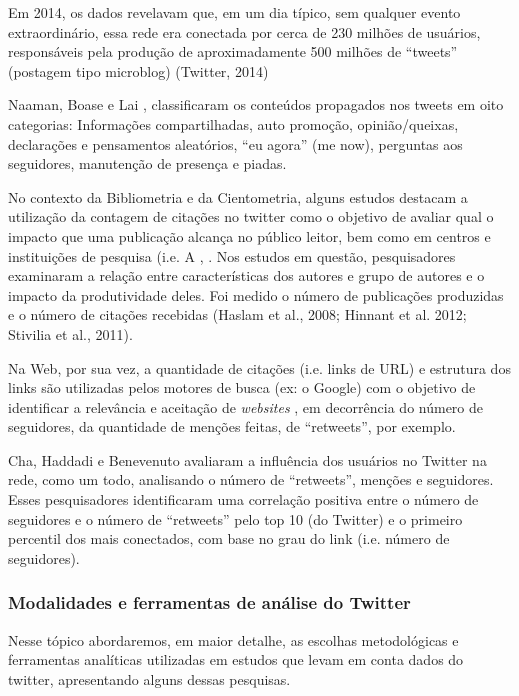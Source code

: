 Em 2014, os dados revelavam que, em um dia típico, sem qualquer evento extraordinário, essa rede era conectada por cerca de 230 milhões de usuários, responsáveis pela produção de aproximadamente 500 milhões de ``tweets'' (postagem tipo microblog) (Twitter, 2014) 

Naaman, Boase e Lai \cite{naaman2010really}, classificaram os   conteúdos propagados nos tweets em oito categorias: Informações compartilhadas, auto promoção, opinião/queixas, declarações e pensamentos aleatórios, ``eu agora'' (me now), perguntas aos seguidores, manutenção de presença e piadas. 

No contexto da Bibliometria e da Cientometria, alguns estudos destacam a utilização da contagem de citações no twitter como o objetivo  de avaliar qual o impacto que uma publicação alcança no público leitor, bem como em centros e instituições de pesquisa (i.e. A \cite{adkins2006scholarly}, \cite{cunningham1997authorship}. Nos estudos em questão, pesquisadores examinaram a relação entre características dos autores e grupo de autores e o impacto da produtividade deles. Foi medido o número de publicações produzidas e o número de citações recebidas (Haslam et al., 2008; Hinnant et al. 2012; Stivilia et al., 2011). 

Na Web, por sua vez, a quantidade de citações (i.e. links de URL) e estrutura dos links são utilizadas pelos motores de busca (ex: o Google) com o objetivo de identificar a relevância e aceitação de \textit{websites} \cite{brin1998anatomy}, em decorrência do número de seguidores, da quantidade de menções feitas, de ``retweets'', por exemplo.

Cha, Haddadi e Benevenuto \cite{cha2010measuring} avaliaram a influência dos usuários no Twitter na rede, como um todo, analisando o número de ``retweets'', menções e seguidores. Esses pesquisadores identificaram uma correlação positiva entre o número de seguidores e o número de ``retweets'' pelo top 10 (do Twitter) e o primeiro percentil dos mais conectados, com base no grau do link (i.e. número de seguidores). 


\subsubsection{Modalidades e ferramentas de análise do Twitter} 

Nesse tópico abordaremos, em maior detalhe, as escolhas metodológicas e ferramentas analíticas utilizadas em estudos que levam em conta dados do twitter, apresentando alguns dessas pesquisas.

